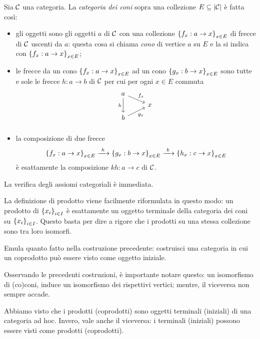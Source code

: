 \begin{costruzione}
Sia \(\mathcal C\) una categoria. La {\em categoria dei coni} sopra una collezione \(E \subseteq \lvert\mathcal C\rvert\) è fatta così:
%
\begin{itemize}
\item gli oggetti sono gli oggetti \(a\) di \(\mathcal C\) con una collezione \(\left\{f_x : a \to x\right\}_{x \in E}\) di frecce di \(\mathcal C\) uscenti da \(a\): questa cosa si chiama {\em cono} di vertice \(a\) su \(E\) e la si indica con \(\left\{f_x : a \to x\right\}_{x \in E}\);
%
\item le frecce da un cono \(\left\{f_x : a \to x\right\}_{x \in E}\) ad un cono \(\left\{g_x : b \to x\right\}_{x \in E}\) sono tutte e sole le frecce \(h : a \to b\) di \(\mathcal C\) per cui per ogni \(x \in E\) commuta
\[\begin{tikzcd}[row sep=tiny]
a \ar["{f_x}", dr] \ar["h",dd, swap] &   \\
                                     & x \\
b \ar["{g_x}", ur, swap]             &   \\
\end{tikzcd}\]
%
\item la composizione di due frecce
\[\left\{f_x : a \to x\right\}_{x \in E} \xrightarrow{\ h\ }
\left\{g_x : b \to x\right\}_{x \in E} \xrightarrow{\ k\ }
\left\{h_x : c \to x\right\}_{x \in E}\]
è esattamente la composizione \(kh : a \to c\) di \(\mathcal C\).
\end{itemize}
%
La verifica degli assiomi categoriali è immediata.
\end{costruzione}

La definizione di prodotto viene facilmente riformulata in questo modo: un prodotto di \(\left\{x_i\right\}_{i \in I}\) è esattamente un oggetto terminale della categoria dei coni su \(\left\{x_i\right\}_{i \in I}\). Questo basta per dire a rigore che i prodotti su una stessa collezione sono tra loro isomorfi.

\begin{esercizio}
Emula quanto fatto nella costruzione precedente: costruisci una categoria in cui un coprodotto può essere visto come oggetto iniziale.
\end{esercizio}

Osservando le precedenti costruzioni, è importante notare questo: un isomorfismo di (co)coni, induce un isomorfismo dei rispettivi vertici; mentre, il viceversa non sempre accade.

\begin{esercizio}
Abbiamo visto che i prodotti (coprodotti) sono oggetti terminali (iniziali) di una categoria ad hoc. Invero, vale anche il viceversa: i terminali (iniziali) possono essere visti come prodotti (coprodotti).
\end{esercizio}

